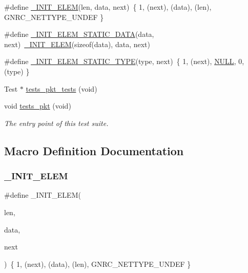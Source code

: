 \begin{DoxyCompactItemize}
\item 
\#define \hyperlink{tests-pkt_8c_ada956c1e1a82c27c7af5980734bad0f5}{\+\_\+\+I\+N\+I\+T\+\_\+\+E\+L\+EM}(len,  data,  next)~\{ 1, (next), (data), (len), G\+N\+R\+C\+\_\+\+N\+E\+T\+T\+Y\+P\+E\+\_\+\+U\+N\+D\+EF \}
\item 
\#define \hyperlink{tests-pkt_8c_a0b93774716724ae87e184165acb9f26f}{\+\_\+\+I\+N\+I\+T\+\_\+\+E\+L\+E\+M\+\_\+\+S\+T\+A\+T\+I\+C\+\_\+\+D\+A\+TA}(data,  next)~\hyperlink{tests-pkt_8c_ada956c1e1a82c27c7af5980734bad0f5}{\+\_\+\+I\+N\+I\+T\+\_\+\+E\+L\+EM}(sizeof(data), data, next)
\item 
\#define \hyperlink{tests-pkt_8c_a56d796ad3c1b5b0f258be9e54de37014}{\+\_\+\+I\+N\+I\+T\+\_\+\+E\+L\+E\+M\+\_\+\+S\+T\+A\+T\+I\+C\+\_\+\+T\+Y\+PE}(type,  next)~\{ 1, (next), \hyperlink{openmote-cc2538_2lwip_2src_2include_2lwip_2def_8h_a070d2ce7b6bb7e5c05602aa8c308d0c4}{N\+U\+LL}, 0, (type) \}
\item 
Test $\ast$ \hyperlink{tests-pkt_8c_a5274bb49e057a0ed117b4deedd9a3f65}{tests\+\_\+pkt\+\_\+tests} (void)
\item 
void \hyperlink{group__unittests_gac6498b5301bbbb078c592d170ae7337d}{tests\+\_\+pkt} (void)
\begin{DoxyCompactList}\small\item\em The entry point of this test suite. \end{DoxyCompactList}\end{DoxyCompactItemize}


\subsection{Macro Definition Documentation}
\mbox{\label{tests-pkt_8c_ada956c1e1a82c27c7af5980734bad0f5}} 
\subsubsection{\texorpdfstring{\+\_\+\+I\+N\+I\+T\+\_\+\+E\+L\+EM}{\_INIT\_ELEM}}
{\footnotesize\ttfamily \#define \+\_\+\+I\+N\+I\+T\+\_\+\+E\+L\+EM(\begin{DoxyParamCaption}\item[{}]{len,  }\item[{}]{data,  }\item[{}]{next }\end{DoxyParamCaption})~\{ 1, (next), (data), (len), G\+N\+R\+C\+\_\+\+N\+E\+T\+T\+Y\+P\+E\+\_\+\+U\+N\+D\+EF \}}

